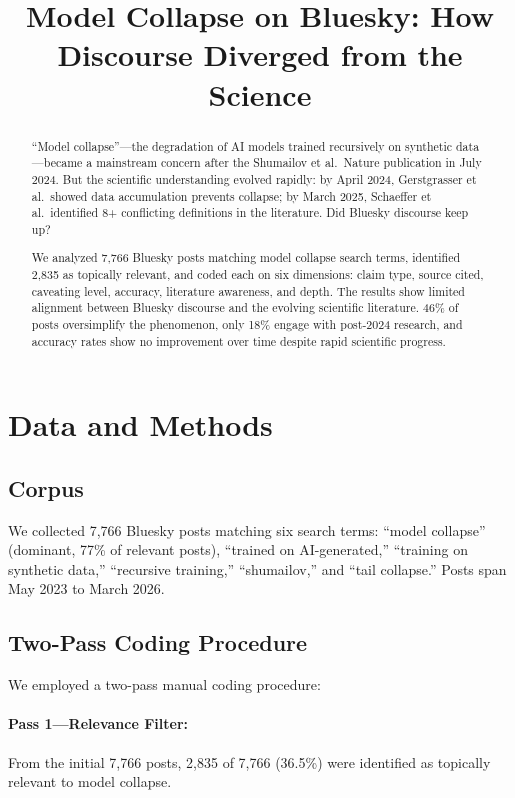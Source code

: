\documentclass[11pt,preprint]{article}
\title{Model Collapse on Bluesky: How Discourse Diverged from the Science}
\author{}
\date{}
\begin{document}
\maketitle

\begin{abstract}
``Model collapse''---the degradation of AI models trained recursively on synthetic data---became a mainstream concern after the Shumailov et al.\ Nature publication in July 2024. But the scientific understanding evolved rapidly: by April 2024, Gerstgrasser et al.\ showed data accumulation prevents collapse; by March 2025, Schaeffer et al.\ identified 8+ conflicting definitions in the literature. Did Bluesky discourse keep up?

We analyzed 7,766 Bluesky posts matching model collapse search terms, identified 2,835 as topically relevant, and coded each on six dimensions: claim type, source cited, caveating level, accuracy, literature awareness, and depth. The results show limited alignment between Bluesky discourse and the evolving scientific literature. 46\% of posts oversimplify the phenomenon, only 18\% engage with post-2024 research, and accuracy rates show no improvement over time despite rapid scientific progress.
\end{abstract}

\section{Data and Methods}
\label{sec:methods}

\subsection{Corpus}
We collected 7,766 Bluesky posts matching six search terms: ``model collapse'' (dominant, 77\% of relevant posts), ``trained on AI-generated,'' ``training on synthetic data,'' ``recursive training,'' ``shumailov,'' and ``tail collapse.'' Posts span May 2023 to March 2026.

\subsection{Two-Pass Coding Procedure}
We employed a two-pass manual coding procedure:

\paragraph{Pass 1---Relevance Filter:}
From the initial 7,766 posts, 2,835 of 7,766 (36.5\%) were identified as topically relevant to model collapse.
\end{document}
